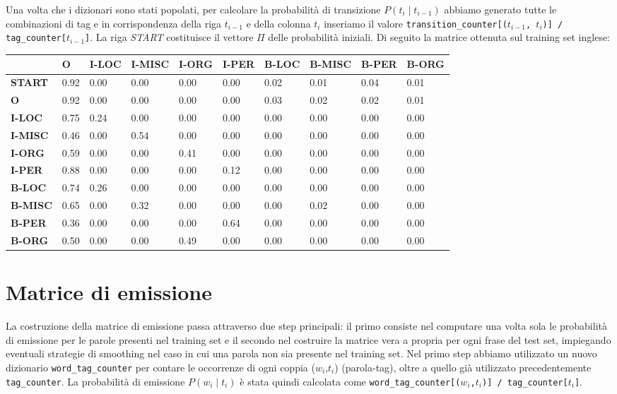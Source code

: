 \documentclass[a4paper,11pt,notitlepage]{report}
\begin{document}
Una volta che i dizionari sono stati popolati, per calcolare la probabilità di transizione $P(t_i \mid t_{i-1})$ abbiamo generato tutte le combinazioni di tag e in corrispondenza della riga $t_{i-1}$ e della colonna $t_i$ inseriamo il valore \texttt{transition\_counter[($t_{i-1}$, $t_i$)] / tag\_counter[$t_{i-1}$]}. La riga \textit{START} costituisce il vettore $\Pi$ delle probabilità iniziali. Di seguito la matrice ottenuta sul training set inglese:

\begin{center}
\footnotesize
\setlength{\tabcolsep}{3pt}
\begin{tabular}{|l|l|l|l|l|l|l|l|l|l|}
\hline
\textbf{} & \textbf{O} & \textbf{I-LOC} & \textbf{I-MISC} & \textbf{I-ORG} & \textbf{I-PER} & \textbf{B-LOC} & \textbf{B-MISC} & \textbf{B-PER} & \textbf{B-ORG} \\ \hline
\textbf{START} & 0.92 & 0.00 & 0.00 & 0.00 & 0.00 & 0.02 & 0.01 & 0.04 & 0.01 \\ \hline
\textbf{O} & 0.92 & 0.00 & 0.00 & 0.00 & 0.00 & 0.03 & 0.02 & 0.02 & 0.01 \\ \hline
\textbf{I-LOC} & 0.75 & 0.24 & 0.00 & 0.00 & 0.00 & 0.00 & 0.00 & 0.00 & 0.00 \\ \hline
\textbf{I-MISC} & 0.46 & 0.00 & 0.54 & 0.00 & 0.00 & 0.00 & 0.00 & 0.00 & 0.00 \\ \hline
\textbf{I-ORG} & 0.59 & 0.00 & 0.00 & 0.41 & 0.00 & 0.00 & 0.00 & 0.00 & 0.00 \\ \hline
\textbf{I-PER} & 0.88 & 0.00 & 0.00 & 0.00 & 0.12 & 0.00 & 0.00 & 0.00 & 0.00 \\ \hline
\textbf{B-LOC} & 0.74 & 0.26 & 0.00 & 0.00 & 0.00 & 0.00 & 0.00 & 0.00 & 0.00 \\ \hline
\textbf{B-MISC} & 0.65 & 0.00 & 0.32 & 0.00 & 0.00 & 0.00 & 0.02 & 0.00 & 0.00 \\ \hline
\textbf{B-PER} & 0.36 & 0.00 & 0.00 & 0.00 & 0.64 & 0.00 & 0.00 & 0.00 & 0.00 \\ \hline
\textbf{B-ORG} & 0.50 & 0.00 & 0.00 & 0.49 & 0.00 & 0.00 & 0.00 & 0.00 & 0.00 \\ \hline
\end{tabular}
\end{center}

\section{Matrice di emissione}
La costruzione della matrice di emissione passa attraverso due step principali: il primo consiste nel computare una volta sola le probabilità di emissione per le parole presenti nel training set e il secondo nel costruire la matrice vera a propria per ogni frase del test set, impiegando eventuali strategie di smoothing nel caso in cui una parola non sia presente nel training set.
Nel primo step abbiamo utilizzato un nuovo dizionario \texttt{word\_tag\_counter} per contare le occorrenze di ogni coppia ($w_i$,$t_i$) (parola-tag), oltre a quello già utilizzato precedentemente \texttt{tag\_counter}.
La probabilità di emissione $P(w_i \mid t_i)$ è stata quindi calcolata come \texttt{word\_tag\_counter[($w_i$,$t_i$)] / tag\_counter[$t_i$]}.
\end{document}
